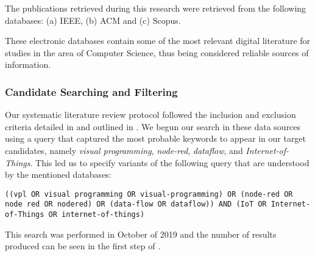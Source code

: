 The publications retrieved during this research were retrieved from the following databases: (a) IEEE, (b) ACM and (c) Scopus.

These electronic databases contain some of the most relevant digital literature for studies in the area of Computer Science, thus being considered reliable sources of information.

\subsubsection{Candidate Searching and Filtering}\label{sec:process}

Our systematic literature review protocol followed the inclusion and exclusion criteria detailed in  and outlined in . We begun our search in these data sources using a query that captured the most probable keywords to appear in our target candidates, namely \emph{visual programming}, \emph{node-red}, \emph{dataflow}, and \emph{Internet-of-Things}. This led us to specify variants of the following query that are understood by the mentioned databases:

\noindent
\begin{lstlisting}[frame=none, numbers=none, backgroundcolor=\color{white},]
((vpl OR visual programming OR visual-programming) OR (node-red OR node red OR nodered) OR (data-flow OR dataflow)) AND (IoT OR Internet-of-Things OR internet-of-things)
\end{lstlisting}

This search was performed in October of 2019 and the number of results produced can be seen in the first step of . 

